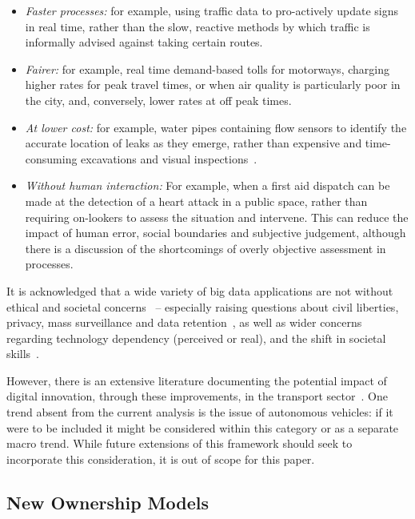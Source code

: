 \documentclass[b5paper,10pt]{article}
\begin{document}
\begin{itemize}
\item {\emph{Faster processes:}} for example, using traffic data to
pro-actively update signs in real time, rather than the slow, reactive
methods by which traffic is informally advised against taking certain
routes.
\item {\emph{Fairer:}} for example, real time demand-based tolls for
motorways, charging higher rates for peak travel times, or when air
quality is particularly poor in the city, and, conversely, lower rates
at off peak times.
\item {\emph{At lower cost:}} for example, water pipes containing flow
sensors to identify the accurate location of leaks as they emerge,
rather than expensive and time-consuming excavations and visual
inspections~\citep{cosgrave-et-al:2014}.
\item {\emph{Without human interaction:}} For example, when a first
aid dispatch can be made at the detection of a heart attack in a
public space, rather than requiring on-lookers to assess the situation
and intervene. This can reduce the impact of human error, social
boundaries and subjective judgement, although there is a discussion of
the shortcomings of overly objective assessment in processes.
\end{itemize}

It is acknowledged that a wide variety of big data applications are
not without ethical and societal concerns~\citep{bimber:1990} --
especially raising questions about civil liberties, privacy, mass
surveillance and data
retention~\citep{goold:2002,oatley-et-al_dasc:2015}, as well as wider
concerns regarding technology dependency (perceived or real), and the
shift in societal skills~\citep{tryfonas+crick:petra2018}.

However, there is an extensive literature documenting the potential
impact of digital innovation, through these improvements, in the
transport sector~\citep{enoch:2015}. One trend absent from the current
analysis is the issue of autonomous vehicles: if it were to be
included it might be considered within this category or as a separate
macro trend. While future extensions of this framework should seek to
incorporate this consideration, it is out of scope for this paper.

\subsection{New Ownership Models}
\end{document}
